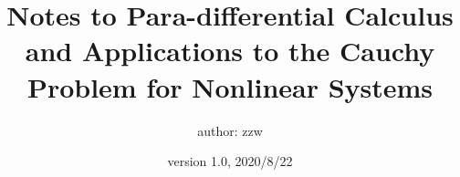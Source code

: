 \documentclass{article}
\begin{document}
\title{Notes to Para-differential Calculus and
Applications to the Cauchy Problem
for Nonlinear Systems}
\author{author: zzw}
\date{version 1.0, 2020/8/22}
\maketitle

\tableofcontents






\end{document}
